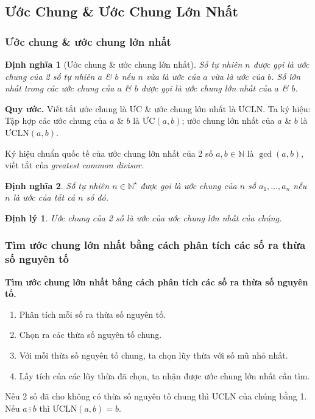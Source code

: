 \documentclass{article}
\numberwithin{equation}{section}
\newtheorem{definition}{Định nghĩa}[section]
\newtheorem{theorem}{Định lý}[section]
\begin{document}
\subsection{Ước Chung \& Ước Chung Lớn Nhất}

\subsubsection{Ước chung \& ước chung lớn nhất}

\begin{definition}[Ước chung \& ước chung lớn nhất]
	Số tự nhiên $n$ được gọi là \emph{ước chung} của 2 số tự nhiên $a$ \& $b$ nếu $n$ vừa là ước của $a$ vừa là ước của $b$. Số lớn nhất trong các ước chung của $a$ \& $b$ được gọi là \emph{ước chung lớn nhất} của $a$ \& $b$.
\end{definition}
\noindent\textbf{Quy ước.} Viết tắt ước chung là ƯC \& ước chung lớn nhất là ƯCLN. Ta ký hiệu: Tập hợp các ước chung của $a$ \& $b$ là $\mbox{ƯC}(a,b)$; ước chung lớn nhất của $a$ \& $b$ là $\mbox{ƯCLN}(a,b)$.

Ký hiệu chuẩn quốc tế của ước chung lớn nhất của 2 số $a,b\in\mathbb{N}$ là $\gcd(a,b)$, viết tắt của \textit{greatest common divisor}.

\begin{definition}
	Số tự nhiên $n\in\mathbb{N}^\star$ được gọi là \emph{ước chung} của $n$ số $a_1,\ldots,a_n$ nếu $n$ là ước của tất cả $n$ số đó.
\end{definition}

\begin{theorem}
	Ước chung của 2 số là ước của ước chung lớn nhất của chúng.
\end{theorem}

\subsubsection{Tìm ước chung lớn nhất bằng cách phân tích các số ra thừa số nguyên tố}
\begin{tcolorbox}
	\textbf{Tìm ước chung lớn nhất bằng cách phân  tích các số ra thừa số nguyên tố.}
	\begin{enumerate}
		\item Phân tích mỗi số ra thừa số nguyên tố.
		\item Chọn ra các thừa số nguyên tố chung.
		\item Với mỗi thừa số nguyên tố chung, ta chọn lũy thừa với số mũ nhỏ nhất.
		\item Lấy tích của các lũy thừa đã chọn, ta nhận được ước chung lớn nhất cần tìm.
	\end{enumerate}
\end{tcolorbox}
Nếu 2 số đã cho không có thừa số nguyên tố chung thì ƯCLN của chúng bằng 1. Nếu $a\ \vdots\ b$ thì $\mbox{ƯCLN}(a,b) = b$.
\end{document}
